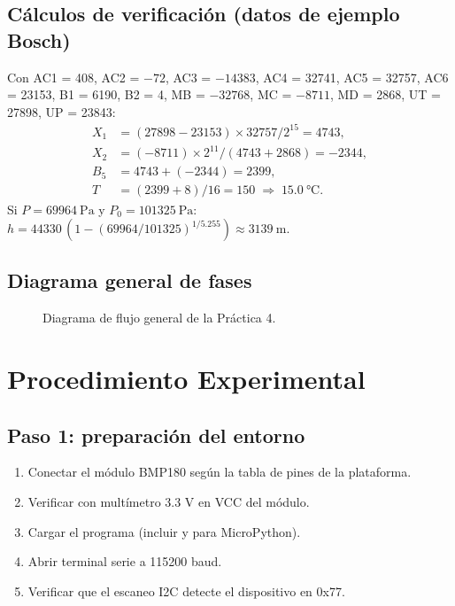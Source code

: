 \documentclass[11pt]{article}
\begin{document}
\subsection{Cálculos de verificación (datos de ejemplo Bosch)}
Con AC1 = 408, AC2 = $-72$, AC3 = $-14383$, AC4 = 32741, AC5 = 32757, AC6 = 23153,
B1 = 6190, B2 = 4, MB = $-32768$, MC = $-8711$, MD = 2868, UT = 27898, UP = 23843:
\begin{align*}
  X_1 &= (27898 - 23153)\times 32757/2^{15} = 4743, \\
  X_2 &= (-8711)\times 2^{11}/(4743 + 2868) = -2344, \\
  B_5 &= 4743 + (-2344) = 2399, \\
  T   &= (2399 + 8)/16 = 150 \;\Rightarrow\; \SI{15.0}{\celsius}.
\end{align*}
Si $P = \SI{69964}{\pascal}$ y $P_0 = \SI{101325}{\pascal}$:
$h = \num{44330}\,(1-(69964/101325)^{1/5.255}) \approx \SI{3139}{\meter}$.

\subsection{Diagrama general de fases}
\begin{figure}[H]\centering
{}
\caption{Diagrama de flujo general de la Práctica 4.}
\end{figure}

\section{Procedimiento Experimental}

\subsection{Paso 1: preparación del entorno}
\begin{enumerate}
  \item Conectar el módulo BMP180 según la tabla de pines de la plataforma.
  \item Verificar con multímetro 3.3 V en VCC del módulo.
  \item Cargar el programa (incluir  y  para
        MicroPython).
  \item Abrir terminal serie a 115200 baud.
  \item Verificar que el escaneo I2C detecte el dispositivo en 0x77.
\end{enumerate}
\end{document}
